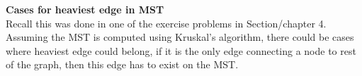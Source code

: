 \documentclass[11pt,fleqn]{article}
\begin{document}
\newpage
\textbf{Cases for heaviest edge in MST}\\

Recall this was done in one of the exercise problems in Section/chapter 4. Assuming the MST is computed using Kruskal's algorithm, there could be cases where heaviest edge could belong, if it is the only edge connecting a node to rest of the graph, then this edge has to exist on the MST.	
\end{document}

